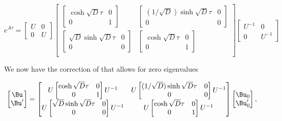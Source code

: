 \begin{dmath}\label{eqn:threeSpringLoopattemptII:700}
e^{A\tau}
=
\begin{bmatrix}
U & 0 \\
0 & U
\end{bmatrix}
\begin{bmatrix}
\begin{bmatrix}
\cosh \sqrt{D} \tau  & 0 \\
0 & 1
\end{bmatrix} &
\begin{bmatrix}
(1/\sqrt{D}) \sinh \sqrt D \tau & 0 \\
0 & 0
\end{bmatrix} \\
\begin{bmatrix}
\sqrt{D} \sinh \sqrt D \tau & 0 \\
0 & 0
\end{bmatrix} &
\begin{bmatrix}
\cosh \sqrt{D} \tau  & 0 \\
0 & 1
\end{bmatrix} \\
\end{bmatrix}
\begin{bmatrix}
U^{-1} & 0 \\
0 & U^{-1}
\end{bmatrix}
\end{dmath}

We now have the correction of  that allows for zero eigenvalues

\begin{dmath}\label{eqn:threeSpringLoopattemptII:720}
\begin{bmatrix}
\Bu \\
\Bu'
\end{bmatrix}
=
\begin{bmatrix}
U 
\begin{bmatrix}
\cosh \sqrt{D} \tau  & 0 \\
0 & 1
\end{bmatrix} U^{-1} 
&
U \begin{bmatrix}
(1/\sqrt{D}) \sinh \sqrt D \tau & 0 \\
0 & 0
\end{bmatrix} U^{-1}
\\
U \begin{bmatrix}
\sqrt{D} \sinh \sqrt D \tau & 0 \\
0 & 0
\end{bmatrix} U^{-1}
&
U \begin{bmatrix}
\cosh \sqrt{D} \tau  & 0 \\
0 & 1
\end{bmatrix} U^{-1}
\\
\end{bmatrix}
\begin{bmatrix}
\Bu_0 \\
\Bu_0'
\end{bmatrix},
\end{dmath}

